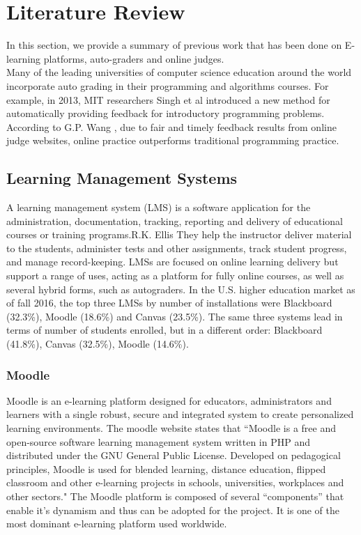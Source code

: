 \documentclass[12pt]{article}
\begin{document}
\newpage

\section{Literature Review}
	In this section, we provide a summary of previous work that has been done on E-learning platforms, auto-graders and online judges.\\
	
	\noindent Many of the leading universities of computer science education around the world incorporate auto grading in their 			programming and algorithms courses. For example, in 2013, MIT researchers Singh et al \cite{singh} introduced a new method for automatically providing feedback for introductory programming problems. According to G.P. Wang \cite{ojpot}, due to fair and timely feedback results from online judge websites, online practice outperforms traditional programming practice.
	
	\subsection{Learning Management Systems}
	A learning management system (LMS) is a software application for the administration, documentation, tracking, reporting and delivery of educational courses or training programs.R.K. Ellis\cite{lms} They help the instructor deliver material to the students, administer tests and other assignments, track student progress, and manage record-keeping. LMSs are focused on online learning delivery but support a range of uses, acting as a platform for fully online courses, as well as several hybrid forms, such as autograders. In the U.S. higher education market as of fall 2016, the top three LMSs by number of installations were Blackboard (32.3\%), Moodle (18.6\%) and Canvas (23.5\%)\cite{lmsstats}.  The same three systems lead in terms of number of students enrolled, but in a different order: Blackboard (41.8\%), Canvas (32.5\%), Moodle (14.6\%).
		\subsubsection{Moodle}
		Moodle is an e-learning platform designed for educators, administrators and learners with a single robust, secure and integrated system to create personalized learning environments. \cite{moodle} The moodle website \cite{moodle} states that ``Moodle is a free and open-source software 	learning management system written in PHP and distributed under the GNU General Public License. Developed on pedagogical principles, Moodle is used for blended learning, distance education, flipped classroom and other e-learning projects in schools, universities, workplaces and other sectors." The Moodle platform is composed of several “components” that enable it's dynamism and thus can be adopted for the project. It is one of the most dominant e-learning platform used worldwide.
\end{document}
